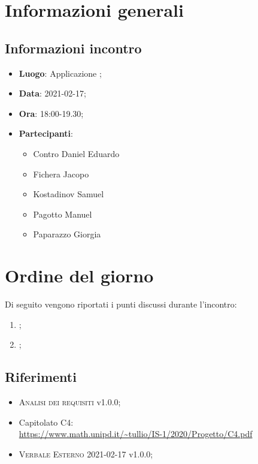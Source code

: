 \documentclass{article}
\begin{document}


\section{Informazioni generali}
\label{sec:info_generali}

\subsection{Informazioni incontro}
\label{sub:info_incontro}

\begin{itemize}
	\item \textbf{Luogo}: Applicazione ;
	\item \textbf{Data}: 2021-02-17;
	\item \textbf{Ora}: 18:00-19.30;
	\item \textbf{Partecipanti}:
	\begin{itemize}
		\item Contro Daniel Eduardo
		\item Fichera Jacopo
		\item Kostadinov Samuel
		\item Pagotto Manuel
		\item Paparazzo Giorgia
	\end{itemize}
\end{itemize}

\section{Ordine del giorno}%
\label{sec:ordine_del_giorno}

Di seguito vengono riportati i punti discussi durante l'incontro:
\begin{enumerate}
	\item {};
	\item {};
\end{enumerate}


\subsection{Riferimenti}%
\label{sub:riferimenti}
\begin{itemize}
    \item \textsc{Analisi dei requisiti} v1.0.0;
	\item Capitolato C4: \\
		\url{https://www.math.unipd.it/~tullio/IS-1/2020/Progetto/C4.pdf}
    \item \textsc{Verbale Esterno 2021-02-17} v1.0.0;
\end{itemize}
\end{document}
